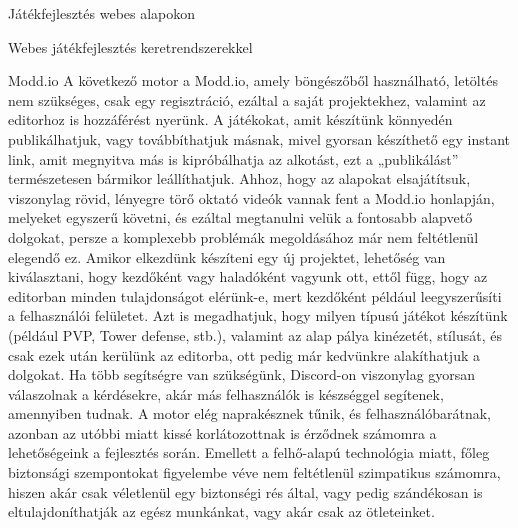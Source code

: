 \begin{MyChapter}{Játékfejlesztés webes alapokon}
\begin{MySection}{Webes játékfejlesztés keretrendszerekkel}
		\begin{MySubSection}{Modd.io}
			A következő motor a Modd.io, amely böngészőből használható, letöltés nem szükséges, csak egy regisztráció, ezáltal a saját projektekhez, valamint az editorhoz is hozzáférést nyerünk. A játékokat, amit készítünk könnyedén publikálhatjuk, vagy továbbíthatjuk másnak, mivel gyorsan készíthető egy instant link, amit megnyitva más is kipróbálhatja az alkotást, ezt a „publikálást” természetesen bármikor leállíthatjuk. Ahhoz, hogy az alapokat elsajátítsuk, viszonylag rövid, lényegre törő oktató videók vannak fent a Modd.io honlapján, melyeket egyszerű követni, és ezáltal megtanulni velük a fontosabb alapvető dolgokat, persze a komplexebb problémák megoldásához már nem feltétlenül elegendő ez. Amikor elkezdünk készíteni egy új projektet, lehetőség van kiválasztani, hogy kezdőként vagy haladóként vagyunk ott, ettől függ, hogy az editorban minden tulajdonságot elérünk-e, mert kezdőként például leegyszerűsíti a felhasználói felületet. Azt is megadhatjuk, hogy milyen típusú játékot készítünk (például PVP, Tower defense, stb.), valamint az alap pálya kinézetét, stílusát, és csak ezek után kerülünk az editorba, ott pedig már kedvünkre alakíthatjuk a dolgokat.
			Ha több segítségre van szükségünk, Discord-on viszonylag gyorsan válaszolnak a kérdésekre, akár más felhasználók is készséggel segítenek, amennyiben tudnak.
			A motor elég naprakésznek tűnik, és felhasználóbarátnak, azonban az utóbbi miatt kissé korlátozottnak is érződnek számomra a lehetőségeink a fejlesztés során.
			Emellett a felhő-alapú technológia miatt, főleg biztonsági szempontokat figyelembe véve nem feltétlenül szimpatikus számomra, hiszen akár csak véletlenül egy biztonségi rés által, vagy pedig szándékosan is eltulajdoníthatják az egész munkánkat, vagy akár csak az ötleteinket.
		\end{MySubSection}
	

\end{MySection}
\end{MyChapter}

